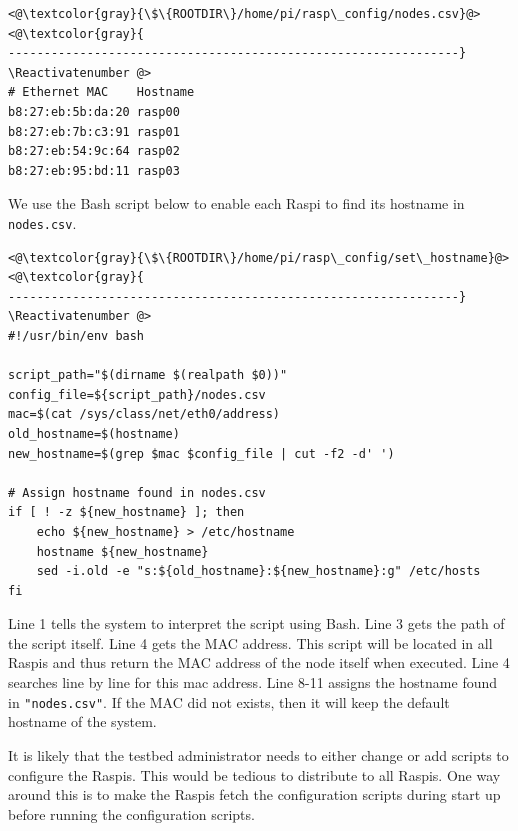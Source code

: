 \Suppressnumber\begin{lstlisting}[]
<@\textcolor{gray}{\$\{ROOTDIR\}/home/pi/rasp\_config/nodes.csv}@>
<@\textcolor{gray}{
---------------------------------------------------------------}
\Reactivatenumber @>
# Ethernet MAC    Hostname
b8:27:eb:5b:da:20 rasp00
b8:27:eb:7b:c3:91 rasp01
b8:27:eb:54:9c:64 rasp02
b8:27:eb:95:bd:11 rasp03
\end{lstlisting}
\FloatBarrier
\vspace{-5mm}

We use the \ac{Bash} script below to enable each \ac{Raspi} to find its
hostname in \texttt{nodes.csv}.

\Suppressnumber\begin{lstlisting}[]
<@\textcolor{gray}{\$\{ROOTDIR\}/home/pi/rasp\_config/set\_hostname}@>
<@\textcolor{gray}{
---------------------------------------------------------------}
\Reactivatenumber @>
#!/usr/bin/env bash

script_path="$(dirname $(realpath $0))"
config_file=${script_path}/nodes.csv 
mac=$(cat /sys/class/net/eth0/address)
old_hostname=$(hostname)
new_hostname=$(grep $mac $config_file | cut -f2 -d' ')

# Assign hostname found in nodes.csv
if [ ! -z ${new_hostname} ]; then
    echo ${new_hostname} > /etc/hostname
    hostname ${new_hostname}
    sed -i.old -e "s:${old_hostname}:${new_hostname}:g" /etc/hosts
fi
\end{lstlisting}
\FloatBarrier
\vspace{-5mm}

Line 1 tells the system to interpret the script using Bash. Line 3 gets the
path of the script itself. Line 4 gets the MAC address. This script will be
located in all \ac{Raspi}s and thus return the MAC address of the node itself
when executed.
Line 4 searches line by line for this mac address.
Line 8-11 assigns the hostname found in \texttt{"nodes.csv"}. If the MAC did not exists,
then it will keep the default hostname of the system.

It is likely that the testbed administrator needs to either change or add
scripts to configure the \ac{Raspi}s. This would be tedious to distribute to
all \ac{Raspi}s. One way around this is to make the \ac{Raspi}s fetch the
configuration scripts during start up before running the configuration scripts.

